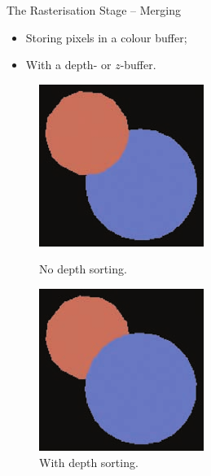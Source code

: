 \documentclass{beamer}
\begin{document}
\begin{frame}{The Rasterisation Stage -- Merging}

	\begin{itemize}
		\item Storing pixels in a colour buffer;
		\item With a depth- or $z$-buffer.
	\end{itemize}


	\begin{figure}
		\centering
		\begin{minipage}{.5\textwidth}
			\centering
			\includegraphics[width=.8\linewidth]{depth-1}
			\caption{No depth sorting.}
		\end{minipage}%
		\begin{minipage}{.5\textwidth}
			\centering
			\includegraphics[width=.8\linewidth]{depth-2}
			\caption{With depth sorting.}
		\end{minipage}
	\end{figure}

\end{frame}
\end{document}
